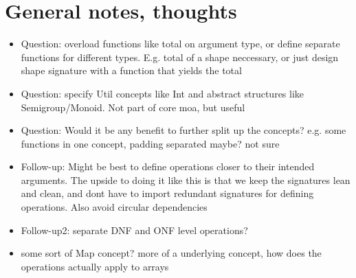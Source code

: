 \documentclass{article}
\begin{document}
\section{General notes, thoughts}

\begin{itemize}
    \item Question: overload functions like total on argument type, or define separate functions for different types. E.g. total of a shape neccessary, or just design shape signature with a function that yields the total
    \item Question: specify Util concepts like Int and abstract structures like Semigroup/Monoid. Not part of core moa, but useful
    \item Question: Would it be any benefit to further split up the concepts? e.g. some functions in one concept, padding separated maybe? not sure
    \item Follow-up: Might be best to define operations closer to their intended arguments. The upside to doing it like this is that we keep the signatures lean and clean, and dont have to import redundant signatures for defining operations. Also avoid circular dependencies
    \item Follow-up2: separate DNF and ONF level operations?
    \item some sort of Map concept? more of a underlying concept, how does the operations actually apply to arrays
\end{itemize}
\end{document}
